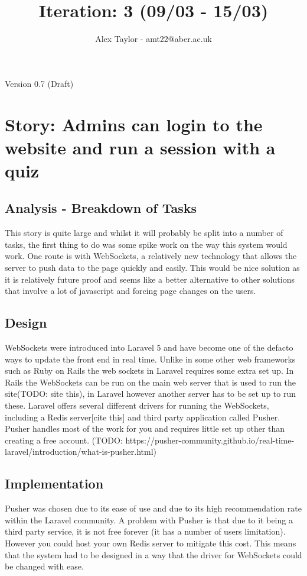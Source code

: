\documentclass{article}
\title{Iteration: 3 (09/03 - 15/03)}
\author{Alex Taylor - amt22@aber.ac.uk}
\begin{document}
\maketitle
\begin{center}
	Version 0.7 (Draft)
\end{center}
\tableofcontents
\thispagestyle{empty}
\newpage

\section{Story: Admins can login to the website and run a session with a quiz}
\subsection{Analysis - Breakdown of Tasks}
This story is quite large and whilst it will probably be split into a number of tasks, the first thing to do was some spike work on the way this system would work. One route is with WebSockets, a relatively new technology that allows the server to push data to the page quickly and easily. This would be nice solution as it is relatively future proof and seems like a better alternative to other solutions that involve a lot of javascript and forcing page changes on the users.
\subsection{Design}
WebSockets were introduced into Laravel 5 and have become one of the defacto ways to update the front end in real time. Unlike in some other web frameworks such as Ruby on Rails the web sockets in Laravel requires some extra set up. In Rails the WebSockets can be run on the main web server that is used to run the site(TODO: site this), in Laravel however another server has to be set up to run these. Laravel offers several different drivers for running the WebSockets, including a Redis server[cite this] and  third party application called Pusher. Pusher handles most of the work for you and requires little set up other than creating a free account. (TODO: https://pusher-community.github.io/real-time-laravel/introduction/what-is-pusher.html)
\subsection{Implementation}
Pusher was chosen due to its ease of use and due to its high recommendation rate within the Laravel community. A problem with Pusher is that due to it being a third party service, it is not free forever (it has a number of users limitation). However you could host your own Redis server to mitigate this cost. This means that the system had to be designed in a way that the driver for WebSockets could be changed with ease.
\end{document}
